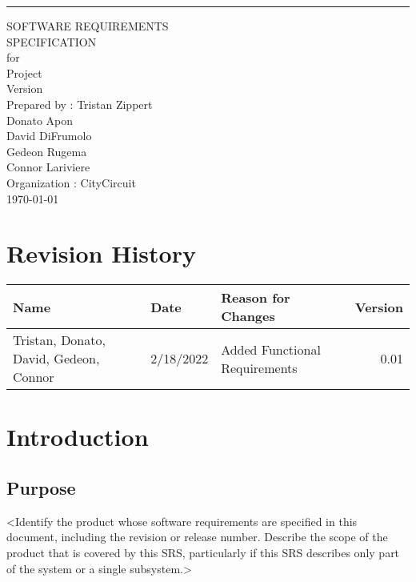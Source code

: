 \documentclass[11pt]{article}
\date{}
\title{}
\begin{document}
\begin{flushright}
    \rule{16cm}{5pt}\vskip1cm
    \begin{bfseries}
        \Huge{SOFTWARE REQUIREMENTS\\ SPECIFICATION}\\
        \vspace{1.5cm}
        for\\
        \vspace{1.5cm}
        Project\\
        \vspace{1.5cm}
        \LARGE{Version \myversion}\\
        \vspace{1.5cm}
        Prepared by : Tristan Zippert\\
    Donato Apon \\
     David DiFrumolo\\
       Gedeon Rugema\\
    Connor Lariviere\\ 
        \vspace{1.5cm}
        Organization : CityCircuit\\
        \vspace{1.5cm}
        \today\\
    \clearpage
    \end{bfseries}
\end{flushright}
\tableofcontents
\section*{Revision History}
\label{sec:orgcbcec99}
\begin{center}
\begin{tabular}{lllr}
Name & Date & Reason for Changes & Version\\
\hline
Tristan, Donato, David, Gedeon, Connor & 2/18/2022 & Added Functional Requirements & 0.01\\
\end{tabular}
\end{center}

\section{Introduction}
\label{sec:orgfd5a4c9}
\subsection{Purpose}
\label{sec:orga5389af}
<Identify the product whose software requirements are specified in this document, including the
revision or release number. Describe the scope of the product that is covered by this SRS,
particularly if this SRS describes only part of the system or a single subsystem.>
\end{document}
